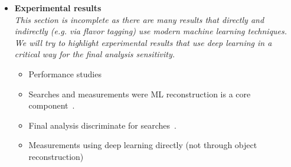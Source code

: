 \documentclass[12pt,letterpaper]{article}
\begin{document}
\begin{itemize}
\begin{itemize}
        \end{itemize}
\item \textbf{Experimental results}
\\\textit{This section is incomplete as there are many results that directly and indirectly (e.g. via flavor tagging) use modern machine learning techniques.  We will try to highlight experimental results that use deep learning in a critical way for the final analysis sensitivity.}
	\begin{itemize}
		\item Performance studies~\cite{CMS:2022prd,Yang:2022dwu,NEOS-II:2022mov,Jiang:2022zho,Gronroos:2023qff}
		\item Searches and measurements were ML reconstruction is a core component~\cite{Keck:2018lcd,MicroBooNE:2021nxr,MicroBooNE:2021jwr,ATLAS:2022ihe,CMS:2022idi,CMS:2022fxs,Li:2022gpb,Tran:2022ago,Manganelli:2022whv,CMS:2022wjc,ATLAS:2023mcc,ATLAS:2023hbp,ATLAS:2023vxg,ATLAS:2023qdu,ATLAS:2023bzb,ATLAS:2023sbu,ATLAS:2023dnm,NOvA:2023uxq,Gravili:2023hbp}.
		\item Final analysis discriminate for searches~\cite{Aad:2019yxi,Aad:2020hzm,collaboration2020dijet,Sirunyan:2020hwz,Manganelli:2022whv}.
		\item Measurements using deep learning directly (not through object reconstruction)~\cite{H1:2021wkz,H1:2023fzk}
	\end{itemize}


\end{itemize}


\clearpage
\flushbottom
%


\end{document}
